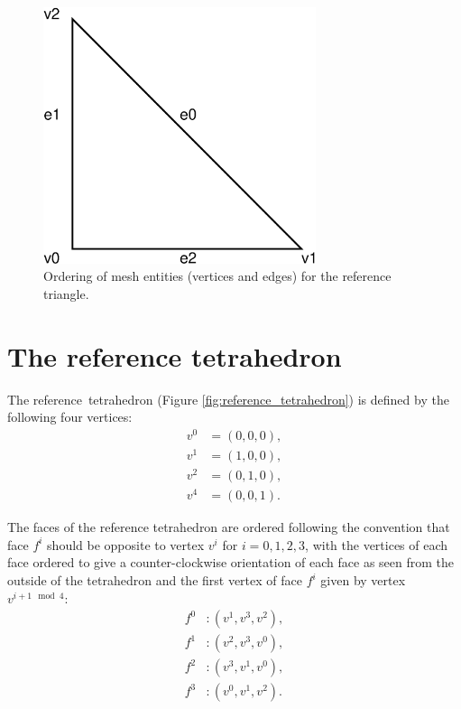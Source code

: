 \begin{figure}[htbp]
  \begin{center}
    \includegraphics[width=8cm]{eps/reference_triangle_entities.eps}
    \caption{Ordering of mesh entities (vertices and edges) for the reference triangle.}
    \label{fig:reference_triangle_entities}
  \end{center}
\end{figure}

\section{The reference tetrahedron}

The reference~tetrahedron (Figure \ref{fig:reference_tetrahedron})
is defined by the following four vertices:
\begin{equation}
  \begin{split}
    v^0 &= (0,0,0), \\
    v^1 &= (1,0,0), \\
    v^2 &= (0,1,0), \\
    v^4 &= (0,0,1).
  \end{split}
\end{equation}

The faces of the reference tetrahedron are ordered following the convention that face $f^i$ should be
opposite to vertex $v^i$ for $i=0,1,2,3$, with the vertices of each face ordered to give a
counter-clockwise orientation of each face as seen from the outside of the tetrahedron and
the first vertex of face $f^i$ given by vertex $v^{i + 1 \mod 4}$:
\begin{equation}
  \begin{split}
    f^0 &: (v^1, v^3, v^2), \\
    f^1 &: (v^2, v^3, v^0), \\
    f^2 &: (v^3, v^1, v^0), \\
    f^3 &: (v^0, v^1, v^2).
  \end{split}
\end{equation}

